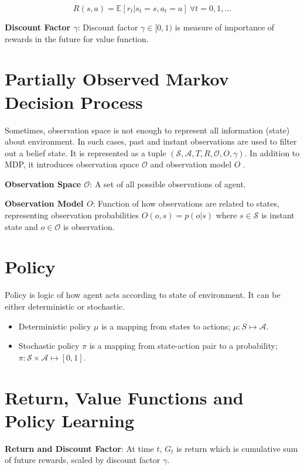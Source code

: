 \begin{equation}
R(s,a) = \mathbb{E}[r_t|s_t=s, a_t=a] \: \forall t = 0,1, ...
\end{equation}

\textbf{Discount Factor $\gamma$}: Discount factor $\gamma \in [0,1)$ is measure of importance of rewards in the future for value function.

\section{Partially Observed Markov Decision Process}
\label{sec:pomdp}
Sometimes, observation space is not enough to represent all information (state) about environment. In such cases, past and instant observations are used to filter out a belief state. It is represented as a tuple $(\mathcal{S},\mathcal{A},T,R,\mathcal{O},O,\gamma)$. In addition to MDP, it introduces observation space $\mathcal{O}$ and observation model $O$ \cite{francois-lavet_introduction_2018}.

\textbf{Observation Space $\mathcal{O}$}: A set of all possible observations of agent.

\textbf{Observation Model $O$}: Function of how observations are related to states, representing observation probabilities $O(o,s) = p(o|s)$ where $s \in \mathcal{S}$ is instant state and $o \in \mathcal{O}$ is observation. 

\section{Policy}

Policy is logic of how agent acts according to state of environment. It can be either deterministic or stochastic. 

\begin{itemize}
	\item Deterministic policy $\mu$ is a mapping from states to actions; $\mu \colon S \mapsto \mathcal{A}$.
	\item Stochastic policy $\pi$ is a mapping from state-action pair to a probability; $\pi \colon \mathcal{S} \times \mathcal{A} \mapsto [0,1]$.
\end{itemize}

\section{Return, Value Functions and Policy Learning}

\textbf{Return and Discount Factor}: At time $t$, $G_t$ is return which is cumulative sum of future rewards, scaled by discount factor $\gamma$.

